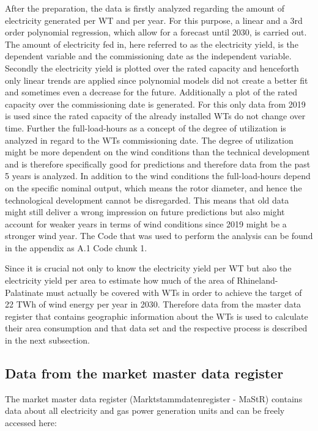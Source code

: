 \documentclass[a4paper,11pt]{article}
\begin{document}
After the preparation, the data is firstly analyzed regarding the amount of electricity generated per WT and per year. For this purpose, a linear and a 3rd order polynomial regression, which allow for a forecast until 2030, is carried out. The amount of electricity fed in, here referred to as the electricity yield, is the dependent variable and the commissioning date as the independent variable. Secondly the electricity yield is plotted over the rated capacity and henceforth only linear trends are applied since polynomial models did not create a better fit and sometimes even a decrease for the future. Additionally a plot of the rated capacity over the commissioning date is generated. For this only data from 2019 is used since the rated capacity of the already installed WTs do not change over time. Further the full-load-hours as a concept of the degree of utilization is analyzed in regard to the WTs commissioning date. The degree of utilization might be more dependent on the wind conditions than the technical development and is therefore specifically good for predictions and therefore data from the past 5 years is analyzed. In addition to the wind conditions the full-load-hours depend on the specific nominal output, which means the rotor diameter, and hence the technological development cannot be disregarded. This means that old data might still deliver a wrong impression on future predictions but also might account for weaker years in terms of wind conditions since 2019 might be a stronger wind year. The Code that was used to perform the analysis can be found in the appendix as A.1 Code chunk 1.

Since it is crucial not only to know the electricity yield per WT but also the electricity yield per area to estimate how much of the area of Rhineland-Palatinate must actually be covered with WTs in order to achieve the target of 22 TWh of wind energy per year in 2030. Therefore data from the master data register that contains geographic information about the WTs is used to calculate their area consumption and that data set and the respective process is described in the next subsection.

\hypertarget{data-from-the-market-master-data-register}{%
\subsection{Data from the market master data register}\label{data-from-the-market-master-data-register}}

The market master data register (Marktstammdatenregister - MaStR) contains data about all electricity and gas power generation units and can be freely accessed here:
\end{document}
